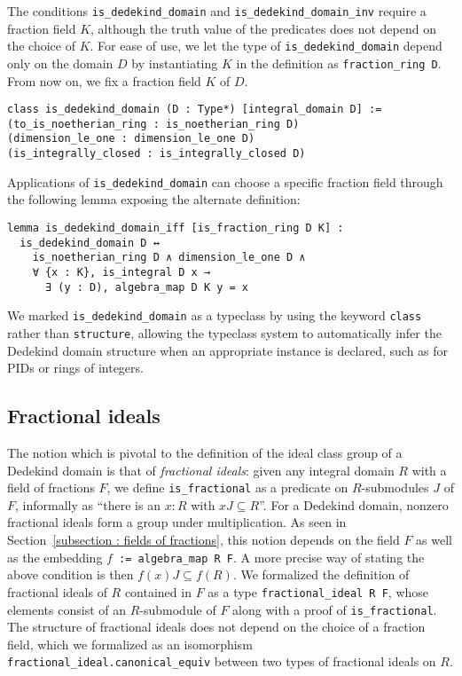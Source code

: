 \documentclass[sn-mathphys]{sn-jnl}%
\newcommand{\lean}[1]{\texttt{#1}\xspace}
\begin{document}
The conditions \lean{is\_dedekind\_domain} and \lean{is\_dedekind\_domain\_inv} require a fraction field $K$,
although the truth value of the predicates does not depend on the choice of $K$.
For ease of use, we let the type of \lean{is\_dedekind\_domain} depend only on the domain $D$
by instantiating $K$ in the definition as \lean{fraction\-\_ring D}. From now on, we fix a fraction field $K$ of $D$.
\begin{lstlisting}
class is_dedekind_domain (D : Type*) [integral_domain D] :=
(to_is_noetherian_ring : is_noetherian_ring D)
(dimension_le_one : dimension_le_one D)
(is_integrally_closed : is_integrally_closed D)
\end{lstlisting}

Applications of \lean{is\_dedekind\_domain} can choose a specific fraction field through the following lemma exposing the alternate definition:
\begin{lstlisting}
lemma is_dedekind_domain_iff [is_fraction_ring D K] :
  is_dedekind_domain D ↔
    is_noetherian_ring D ∧ dimension_le_one D ∧
    ∀ {x : K}, is_integral D x →
      ∃ (y : D), algebra_map D K y = x
\end{lstlisting}

We marked \lean{is\_dedekind\_domain} as a typeclass by using the keyword \lean{class} rather than \lean{structure},
allowing the typeclass system to automatically infer the Dedekind domain structure when an appropriate instance is declared, such as for PIDs or rings of integers.

\subsection{Fractional ideals}\label{subsection:frac_ideals}
The notion which is pivotal to the definition of the ideal class group of a Dedekind domain is that of \emph{fractional ideals}:
given any integral domain $R$ with a field of fractions $F$,
we define \lean{is\_fractional} as a predicate on $R$-submodules $J$ of $F$, informally as ``there is an $x : R$ with $x J \subseteq R$''.
For a Dedekind domain, nonzero fractional ideals form a group under multiplication.
As seen in Section~\ref{subsection : fields of fractions}, this notion depends on the field $F$ as well as the embedding \lean{$f$ := algebra\_map R F}.
A more precise way of stating the above condition is then
$f(x)J\subseteq f(R)$.
We formalized the definition of fractional ideals of $R$ contained in $F$ as a type \lean{fractional\_ideal R F}, whose elements consist of an $R$-submodule of $F$ along with a proof of \lean{is\_fractional}.
The structure of fractional ideals does not depend on the choice of a fraction field,
which we formalized as an isomorphism \lean{fractional\_ideal.canonical\_equiv} between two types of fractional ideals on $R$.
\end{document}
